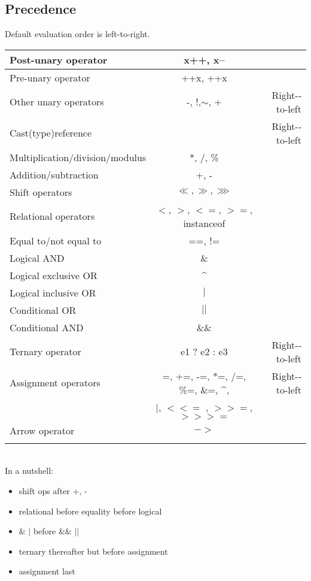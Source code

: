 \documentclass{scrartcl}
\begin{document}
\subsection{Precedence}

    Default evaluation order is left-to-right.

    \begin{tabular}{|l|c|r|}
        \hline
        Post-­unary operator& x++, x-- &  \\
        \hline
        Pre-­unary operator& ++x, ++x &  \\
        \hline
        Other unary operators& -­, !,$\sim$, + &  Right-­to-­left \\
        \hline
        Cast(type)reference&  &  Right-­to-­left \\
        \hline
        Multiplication/division/modulus& *, /, \% &  \\
        \hline
        Addition/subtraction& +, - &  \\
        \hline
        Shift operators& $\ll, \gg, \ggg$ &  \\
        \hline
        Relational operators & $<$, $>$, $<=$, $>=$, instanceof & \\
        \hline
        Equal to/not equal to& ==, != &\\
        \hline
        Logical AND& \& &  \\
        \hline
        Logical exclusive OR& \textasciicircum \\
        \hline
        Logical inclusive OR& $|$ &  \\
        \hline
        Conditional OR& $||$ &  \\
        \hline
        Conditional AND& \&\& &  \\
        \hline
        Ternary operator& e1 ? e2 : e3 & Right-­to-­left\\
        \hline
        Assignment operators& =, +=, -­=, *=, /=, \%=, \&=, \textasciicircum, & Right-­to-­left\\
        & $|$, $<<=$ , $>>=$, $>>>=$ & \\
        \hline
        Arrow operator& $->$ &  \\\\
        \hline
    \end{tabular}
     \\

    In a nutshell:

    \begin{itemize}
        \item shift ops after +, -
        \item relational before equality before logical
        \item \& $|$ before \&\& $||$
        \item ternary thereafter but before assignment
        \item assignment last
    \end{itemize}
\end{document}
